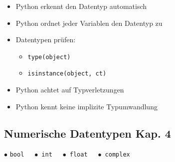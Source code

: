 \begin{itemize}
	\item Python erkennt den Datentyp automatisch
	\item Python ordnet jeder Variablen den Datentyp zu
	\item Datentypen prüfen:
	\begin{itemize}
		\item[\-] \texttt{type(object)}
		\item[\-] \texttt{isinstance(object, ct)}
	\end{itemize}
	\item Python achtet auf Typverletzungen
	\item Python kennt keine implizite Typumwandlung
\end{itemize}

\pagebreak
\subsection[Numerische Datentypen]{Numerische Datentypen \tiny{Kap. 4}}

	$\bullet$ \texttt{bool} $\quad \bullet$ \texttt{int} $\quad\bullet$ \texttt{float} $\quad\bullet$ \texttt{complex}

